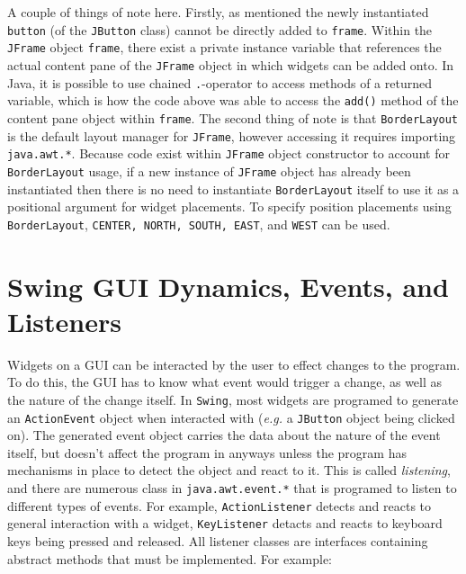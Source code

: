 \documentclass{tufte-handout}
\begin{document}
    A couple of things of note here. Firstly, as mentioned the newly instantiated \texttt{button} (of the \texttt{JButton} class) cannot be directly added to \texttt{frame}. Within the \texttt{JFrame} object \texttt{frame}, there exist a private instance variable that references the actual content pane of the \texttt{JFrame} object in which widgets can be added onto. In Java, it is possible to use chained \texttt{.}-operator to access methods of a returned variable, which is how the code above was able to access the \texttt{add()} method of the content pane object within \texttt{frame}. The second thing of note is that \texttt{BorderLayout} is the default layout manager for \texttt{JFrame}, however accessing it requires importing \texttt{java.awt.*}. Because code exist within \texttt{JFrame} object constructor to account for \texttt{BorderLayout} usage, if a new instance of \texttt{JFrame} object has already been instantiated then there is no need to instantiate \texttt{BorderLayout} itself to use it as a positional argument for widget placements. To specify position placements using \texttt{BorderLayout}, \texttt{CENTER, NORTH, SOUTH, EAST}, and \texttt{WEST} can be used. 

    \section*{Swing GUI Dynamics, Events, and Listeners}
    Widgets on a GUI can be interacted by the user to effect changes to the program. To do this, the GUI has to know what event would trigger a change, as well as the nature of the change itself. In \texttt{Swing}, most widgets are programed to generate an \texttt{ActionEvent} object when interacted with (\textit{e.g.} a \texttt{JButton} object being clicked on). The generated event object carries the data about the nature of the event itself, but doesn't affect the program in anyways unless the program has mechanisms in place to detect the object and react to it. This is called \emph{listening}, and there are numerous class in \texttt{java.awt.event.*} that is programed to listen to different types of events. For example, \texttt{ActionListener} detects and reacts to general interaction with a widget, \texttt{KeyListener} detacts and reacts to keyboard keys being pressed and released. All listener classes are interfaces containing abstract methods that must be implemented. For example:
\end{document}
